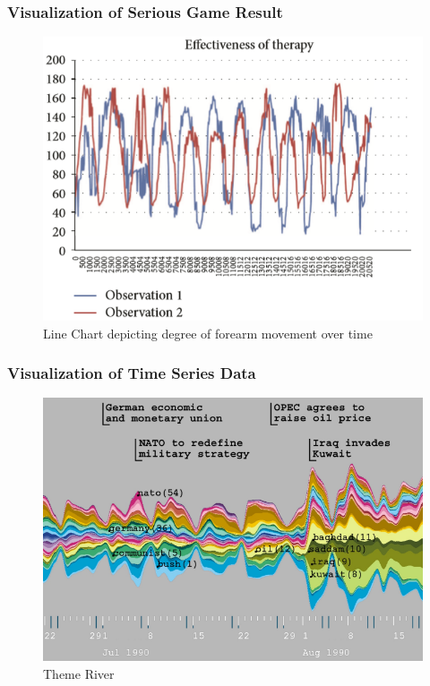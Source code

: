 \documentclass[xcolor=table]{beamer}
\begin{document}
\begin{frame}
\frametitle{Visualization of Serious Game Result}
\begin{figure}
\includegraphics[scale=0.5]{images/rahman_viz.png}
\caption{Line Chart depicting degree of forearm movement over time}
\end{figure}
\end{frame}



\begin{frame}
\frametitle{Visualization of Time Series Data}
\begin{figure}
\includegraphics[scale=0.5]{images/havre_themeriver.png}
\caption{Theme River}
\end{figure}
\end{frame}
\end{document}
